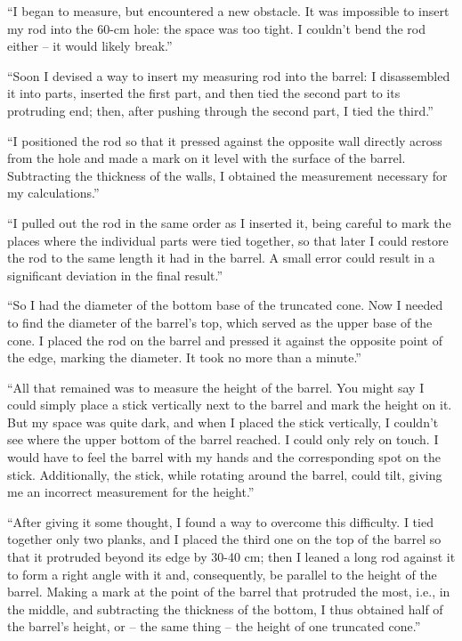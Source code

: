 ``I began to measure, but encountered a new obstacle. It was impossible to insert my rod into the 60-cm hole: the space was too tight. I couldn't bend the rod either -- it would likely break.''

``Soon I devised a way to insert my measuring rod into the barrel: I disassembled it into parts, inserted the first part, and then tied the second part to its protruding end; then, after pushing through the second part, I tied the third.''

``I positioned the rod so that it pressed against the opposite wall directly across from the hole and made a mark on it level with the surface of the barrel. Subtracting the thickness of the walls, I obtained the measurement necessary for my calculations.''

``I pulled out the rod in the same order as I inserted it, being careful to mark the places where the individual parts were tied together, so that later I could restore the rod to the same length it had in the barrel. A small error could result in a significant deviation in the final result.''

``So I had the diameter of the bottom base of the truncated cone. Now I needed to find the diameter of the barrel's top, which served as the upper base of the cone. I placed the rod on the barrel and pressed it against the opposite point of the edge, marking the diameter. It took no more than a minute.''

``All that remained was to measure the height of the barrel. You might say I could simply place a stick vertically next to the barrel and mark the height on it. But my space was quite dark, and when I placed the stick vertically, I couldn't see where the upper bottom of the barrel reached. I could only rely on touch. I would have to feel the barrel with my hands and the corresponding spot on the stick. Additionally, the stick, while rotating around the barrel, could tilt, giving me an incorrect measurement for the height.''


``After giving it some thought, I found a way to overcome this difficulty. I tied together only two planks, and I placed the third one on the top of the barrel so that it protruded beyond its edge by 30-40 cm; then I leaned a long rod against it to form a right angle with it and, consequently, be parallel to the height of the barrel. Making a mark at the point of the barrel that protruded the most, i.e., in the middle, and subtracting the thickness of the bottom, I thus obtained half of the barrel's height, or -- the same thing -- the height of one truncated cone.''

